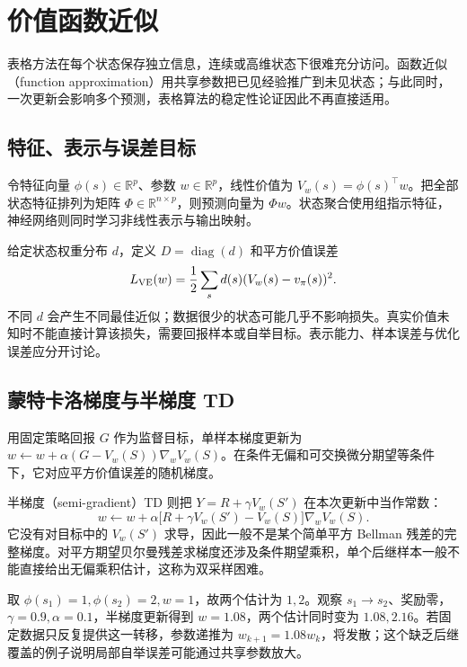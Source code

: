 \setcounter{chapter}{11} %
\chapter{价值函数近似}
\label{ch:rl-approximation}

表格方法在每个状态保存独立信息，连续或高维状态下很难充分访问。函数近似（function approximation）用共享参数把已见经验推广到未见状态；与此同时，一次更新会影响多个预测，表格算法的稳定性论证因此不再直接适用。

\section{特征、表示与误差目标}

令特征向量 $\phi(s)\in\mathbb R^p$、参数 $w\in\mathbb R^p$，线性价值为 $V_w(s)=\phi(s)^\top w$。把全部状态特征排列为矩阵 $\Phi\in\mathbb R^{n\times p}$，则预测向量为 $\Phi w$。状态聚合使用组指示特征，神经网络则同时学习非线性表示与输出映射。

给定状态权重分布 $d$，定义 $D=\operatorname{diag}(d)$ 和平方价值误差
\[
L_{\rm VE}(w)=\frac12\sum_s d(s)(V_w(s)-v_\pi(s))^2.
\]
不同 $d$ 会产生不同最佳近似；数据很少的状态可能几乎不影响损失。真实价值未知时不能直接计算该损失，需要回报样本或自举目标。表示能力、样本误差与优化误差应分开讨论。

\section{蒙特卡洛梯度与半梯度 TD}

用固定策略回报 $G$ 作为监督目标，单样本梯度更新为 $w\leftarrow w+\alpha(G-V_w(S))\nabla_wV_w(S)$。在条件无偏和可交换微分期望等条件下，它对应平方价值误差的随机梯度。

半梯度（semi-gradient）TD 则把 $Y=R+\gamma V_w(S')$ 在本次更新中当作常数：
\begin{equation}
w\leftarrow w+\alpha\bigl[R+\gamma V_w(S')-V_w(S)\bigr]\nabla_wV_w(S).
\label{eq:rl-semi-gradient}
\end{equation}
它没有对目标中的 $V_w(S')$ 求导，因此一般不是某个简单平方 Bellman 残差的完整梯度。对平方期望贝尔曼残差求梯度还涉及条件期望乘积，单个后继样本一般不能直接给出无偏乘积估计，这称为双采样困难。

\begin{example}[共享参数的影响]
取 $\phi(s_1)=1,\phi(s_2)=2,w=1$，故两个估计为 $1,2$。观察 $s_1\to s_2$、奖励零，$\gamma=0.9,\alpha=0.1$，半梯度更新得到 $w=1.08$，两个估计同时变为 $1.08,2.16$。若固定数据只反复提供这一转移，参数递推为 $w_{k+1}=1.08w_k$，将发散；这个缺乏后继覆盖的例子说明局部自举误差可能通过共享参数放大。
\end{example}


